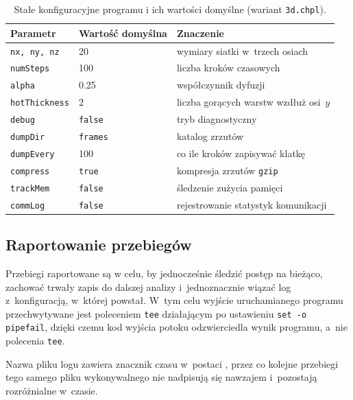 \begin{table}[H]
  \centering
  \caption{Stałe konfiguracyjne programu i ich wartości domyślne (wariant \texttt{3d.chpl}).}
  \label{tab:config}
  \begin{tabular}{lll}
    \toprule
    Parametr & Wartość domyślna & Znaczenie \\
    \midrule
    \texttt{nx, ny, nz} & \num{20} & wymiary siatki w~trzech osiach \\
    \texttt{numSteps}   & \num{100} & liczba kroków czasowych \\
    \texttt{alpha}      & \num{0.25} & współczynnik dyfuzji \\
    \texttt{hotThickness} & \num{2} & liczba gorących warstw wzdłuż osi~$y$ \\
    \texttt{debug}      & \texttt{false} & tryb diagnostyczny \\
    \texttt{dumpDir}    & \texttt{frames} & katalog zrzutów \\
    \texttt{dumpEvery}  & \num{100} & co ile kroków zapisywać klatkę \\
    \texttt{compress}   & \texttt{true} & kompresja zrzutów \texttt{gzip} \\
    \texttt{trackMem}   & \texttt{false} & śledzenie zużycia pamięci \\
    \texttt{commLog}    & \texttt{false} & rejestrowanie statystyk komunikacji \\
    \bottomrule
  \end{tabular}
\end{table}

\subsection{Raportowanie przebiegów}
\label{sec:depl:rejestrowanie}

Przebiegi raportowane są w celu, by jednocześnie śledzić postęp na bieżąco, zachować trwały zapis do dalszej analizy i~jednoznacznie wiązać log z~konfiguracją, w~której powstał. W~tym celu wyjście uruchamianego programu przechwytywane jest poleceniem \texttt{tee}
działającym po ustawieniu \texttt{set -o pipefail}, dzięki czemu kod wyjścia potoku odzwierciedla
wynik programu, a~nie polecenia \texttt{tee}.

Nazwa pliku logu zawiera znacznik czasu w~postaci , przez co kolejne przebiegi tego samego pliku wykonywalnego nie nadpisują się nawzajem i~pozostają rozróżnialne w~czasie. 

